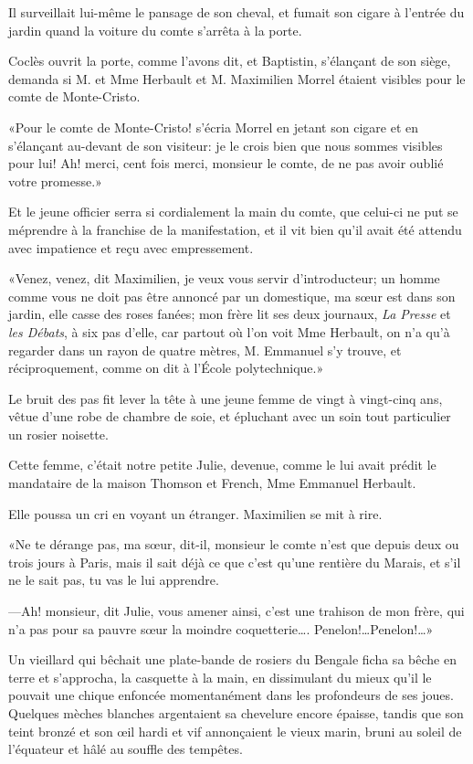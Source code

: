 Il surveillait lui-même le pansage de son cheval, et fumait son cigare à l'entrée du jardin quand la voiture du comte s'arrêta à la porte. 

Coclès ouvrit la porte, comme l'avons dit, et Baptistin, s'élançant de son siège, demanda si M. et Mme Herbault et M. Maximilien Morrel étaient visibles pour le comte de Monte-Cristo.  

«Pour le comte de Monte-Cristo! s'écria Morrel en jetant son cigare et en s'élançant au-devant de son visiteur: je le crois bien que nous sommes visibles pour lui! Ah! merci, cent fois merci, monsieur le comte, de ne pas avoir oublié votre promesse.» 

Et le jeune officier serra si cordialement la main du comte, que celui-ci ne put se méprendre à la franchise de la manifestation, et il vit bien qu'il avait été attendu avec impatience et reçu avec empressement. 

«Venez, venez, dit Maximilien, je veux vous servir d'introducteur; un homme comme vous ne doit pas être annoncé par un domestique, ma sœur est dans son jardin, elle casse des roses fanées; mon frère lit ses deux journaux, \textit{La Presse} et \textit{les Débats}, à six pas d'elle, car partout où l'on voit Mme Herbault, on n'a qu'à regarder dans un rayon de quatre mètres, M. Emmanuel s'y trouve, et réciproquement, comme on dit à l'École polytechnique.» 

Le bruit des pas fit lever la tête à une jeune femme de vingt à vingt-cinq ans, vêtue d'une robe de chambre de soie, et épluchant avec un soin tout particulier un rosier noisette. 

Cette femme, c'était notre petite Julie, devenue, comme le lui avait prédit le mandataire de la maison Thomson et French, Mme Emmanuel Herbault. 

Elle poussa un cri en voyant un étranger. Maximilien se mit à rire.  

«Ne te dérange pas, ma sœur, dit-il, monsieur le comte n'est que depuis deux ou trois jours à Paris, mais il sait déjà ce que c'est qu'une rentière du Marais, et s'il ne le sait pas, tu vas le lui apprendre. 

—Ah! monsieur, dit Julie, vous amener ainsi, c'est une trahison de mon frère, qui n'a pas pour sa pauvre sœur la moindre coquetterie\dots. Penelon!\dots Penelon!\dots» 

Un vieillard qui bêchait une plate-bande de rosiers du Bengale ficha sa bêche en terre et s'approcha, la casquette à la main, en dissimulant du mieux qu'il le pouvait une chique enfoncée momentanément dans les profondeurs de ses joues. Quelques mèches blanches argentaient sa chevelure encore épaisse, tandis que son teint bronzé et son œil hardi et vif annonçaient le vieux marin, bruni au soleil de l'équateur et hâlé au souffle des tempêtes. 

